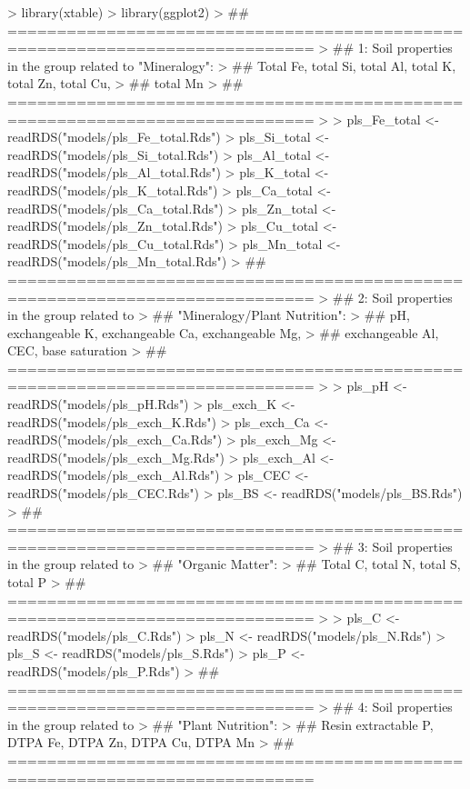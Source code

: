 \documentclass[11pt,%
  abstracton, english]
	{report}
\begin{document}


\begin{Schunk}
\end{Schunk}

\begin{Schunk}
\begin{Sinput}
> library(xtable)
> library(ggplot2)
> ## =============================================================================
> ## 1: Soil properties in the group related to "Mineralogy":
> ## Total Fe, total Si, total Al, total K, total Zn, total Cu,
> ## total Mn
> ## =============================================================================
> 
> pls_Fe_total <- readRDS("models/pls_Fe_total.Rds")
> pls_Si_total <- readRDS("models/pls_Si_total.Rds")
> pls_Al_total <- readRDS("models/pls_Al_total.Rds")
> pls_K_total <- readRDS("models/pls_K_total.Rds")
> pls_Ca_total <- readRDS("models/pls_Ca_total.Rds")
> pls_Zn_total <- readRDS("models/pls_Zn_total.Rds")
> pls_Cu_total <- readRDS("models/pls_Cu_total.Rds")
> pls_Mn_total <- readRDS("models/pls_Mn_total.Rds")
> ## =============================================================================
> ## 2: Soil properties in the group related to
> ## "Mineralogy/Plant Nutrition":
> ## pH, exchangeable K, exchangeable Ca, exchangeable Mg,
> ## exchangeable Al, CEC, base saturation
> ## =============================================================================
> 
> pls_pH <- readRDS("models/pls_pH.Rds")
> pls_exch_K <- readRDS("models/pls_exch_K.Rds")
> pls_exch_Ca <- readRDS("models/pls_exch_Ca.Rds")
> pls_exch_Mg <- readRDS("models/pls_exch_Mg.Rds")
> pls_exch_Al <- readRDS("models/pls_exch_Al.Rds")
> pls_CEC <- readRDS("models/pls_CEC.Rds")
> pls_BS <- readRDS("models/pls_BS.Rds")
> ## =============================================================================
> ## 3: Soil properties in the group related to
> ## "Organic Matter":
> ## Total C, total N, total S, total P
> ## =============================================================================
> 
> pls_C <- readRDS("models/pls_C.Rds")
> pls_N <- readRDS("models/pls_N.Rds")
> pls_S <- readRDS("models/pls_S.Rds")
> pls_P <- readRDS("models/pls_P.Rds")
> ## =============================================================================
> ## 4: Soil properties in the group related to
> ## "Plant Nutrition":
> ## Resin extractable P, DTPA Fe, DTPA Zn, DTPA Cu, DTPA Mn
> ## =============================================================================

\end{Sinput}
\end{Schunk}
\end{document}
